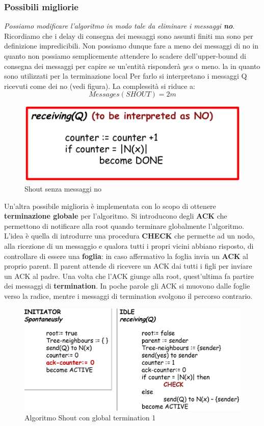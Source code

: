 \documentclass[12pt]{article}
\begin{document}
		\subsubsection{Possibili migliorie}
			\textit{Possiamo modificare l'algoritmo in modo tale da eliminare i messaggi \textbf{no}}. Ricordiamo che i delay di consegna dei messaggi sono assunti finiti ma sono per definizione impredicibili. Non possiamo dunque fare a meno dei messaggi di no in quanto non possiamo semplicemente attendere lo scadere  dell'upper-bound di consegna dei messaggi per capire se un'entità risponderà $yes$ o meno. la in quanto sono utilizzati per la terminazione local Per farlo si interpretano i messaggi Q ricevuti come dei no (vedi figura).  La complessità si riduce a:
			$$Messages(SHOUT) = 2m$$
			\begin{figure}[h!]
				\centering
				\includegraphics[scale=0.25]{img/shoutmod.png}
				\caption{Shout senza messaggi no}
			\end{figure}
			Un'altra possibile miglioria è implementata con lo scopo di ottenere \textbf{terminazione globale} per l'algoritmo. Si introducono degli \textbf{ACK} che permettono di notificare alla root quando terminare globalmente l'algoritmo. L'idea è quella di introdurre una procedura \textbf{CHECK} che permette ad un nodo, alla ricezione di un messaggio e qualora tutti i propri vicini abbiano risposto, di controllare di essere una \textbf{foglia}: in caso affermativo la foglia invia un \textbf{ACK} al proprio parent. Il parent attende di ricevere un ACK dai tutti i figli per inviare un ACK al padre. Una volta che l'ACK giunge alla root, quest'ultima fa partire dei messaggi di \textbf{termination}. In poche parole gli ACK si muovono dalle foglie verso la radice, mentre i messaggi di termination svolgono il percorso contrario.
			\begin{figure}[h!]
				\centering
				\includegraphics[scale=0.30]{img/shoutterm.png}
				\caption{Algoritmo Shout con global termination 1}
			\end{figure}
\end{document}
